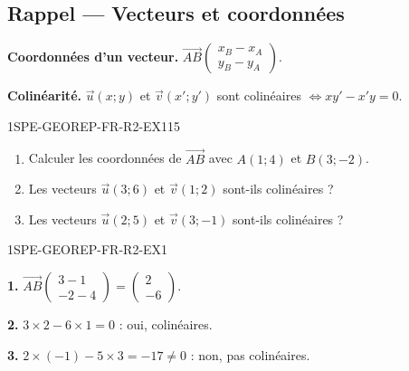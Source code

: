 

\subsection*{Rappel — Vecteurs et coordonnées}

\textbf{Coordonnées d'un vecteur.} $\vec{AB}\begin{pmatrix} x_B - x_A \\ y_B - y_A \end{pmatrix}$.

\textbf{Colinéarité.} $\vec{u}(x ; y)$ et $\vec{v}(x' ; y')$ sont colinéaires $\iff xy' - x'y = 0$.

\begin{exercice}{1SPE-GEOREP-FR-R2-EX1}{1}{5}
\begin{enumerate}
  \item Calculer les coordonnées de $\vec{AB}$ avec $A(1 ; 4)$ et $B(3 ; -2)$.
  \item Les vecteurs $\vec{u}(3 ; 6)$ et $\vec{v}(1 ; 2)$ sont-ils colinéaires ?
  \item Les vecteurs $\vec{u}(2 ; 5)$ et $\vec{v}(3 ; -1)$ sont-ils colinéaires ?
\end{enumerate}
\end{exercice}


\begin{corrige}{1SPE-GEOREP-FR-R2-EX1}

\textbf{1.} $\vec{AB}\begin{pmatrix} 3-1 \\ -2-4 \end{pmatrix} = \begin{pmatrix} 2 \\ -6 \end{pmatrix}$.

\textbf{2.} $3 \times 2 - 6 \times 1 = 0$ : oui, colinéaires.

\textbf{3.} $2 \times (-1) - 5 \times 3 = -17
\neq 0$ : non, pas colinéaires.

\end{corrige}
